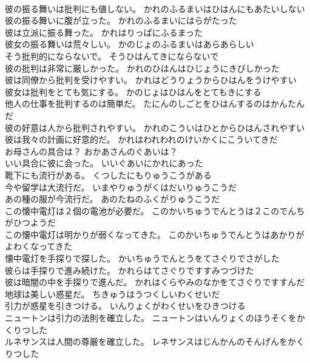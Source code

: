 \documentclass[8pt]{extreport}
\begin{document}
\begin{CJK}{UTF8}{min}
\\	彼の振る舞いは批判にも値しない。	かれのふるまいはひはんにもあたいしない 
\\	彼の振る舞いに腹が立った。	かれのふるまいにはらがたった 
\\	彼は立派に振る舞った。	かれはりっぱにふるまった 
\\	彼女の振る舞いは荒々しい。	かのじょのふるまいはあらあらしい 
\\	そう批判的にならないで。	そうひはんてきにならないで 
\\	彼の批判は非常に厳しかった。	かれのひはんはひじょうにきびしかった 
\\	彼は同僚から批判を受けやすい。	かれはどうりょうからひはんをうけやすい 
\\	彼女は批判をとても気にする。	かのじょはひはんをとてもきにする 
\\	他人の仕事を批判するのは簡単だ。	たにんのしごとをひはんするのはかんたんだ 
\\	彼の好意は人から批判されやすい。	かれのこういはひとからひはんされやすい 
\\	彼は我々の計画に好意的だ。	かれはわれわれのけいかくにこういてきだ 
\\	お母さんの具合は？	おかあさんのぐあいは？ 
\\	いい具合に彼に会った。	いいぐあいにかれにあった 
\\	靴下にも流行がある。	くつしたにもりゅうこうがある 
\\	今や留学は大流行だ。	いまやりゅうがくはだいりゅうこうだ 
\\	あの種の服が今流行だ。	あのたねのふくがりゅうこうだ 
\\	この懐中電灯は２個の電池が必要だ。	このかいちゅうでんとうは２このでんちがひつようだ 
\\	この懐中電灯は明かりが弱くなってきた。	このかいちゅうでんとうはあかりがよわくなってきた 
\\	懐中電灯を手探りで探した。	かいちゅうでんとうをてさぐりでさがした 
\\	彼らは手探りで進み続けた。	かれらはてさぐりですすみつづけた 
\\	彼は暗闇の中を手探りで進んだ。	かれはくらやみのなかをてさぐりですすんだ 
\\	地球は美しい惑星だ。	ちきゅうはうつくしいわくせいだ 
\\	引力が惑星を引きつける。	いんりょくがわくせいをひきつける 
\\	ニュートンは引力の法則を確立した。	ニュートンはいんりょくのほうそくをかくりつした 
\\	ルネサンスは人間の尊厳を確立した。	レネサンスはじんかんのそんげんをかくりつした 

\end{CJK}
\end{document}
